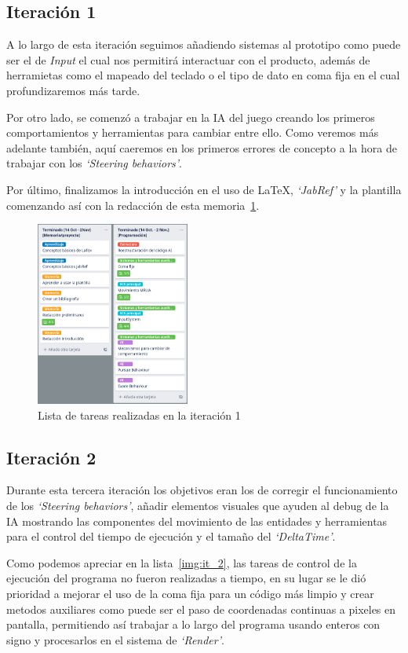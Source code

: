 \subsection{Iteración 1}
A lo largo de esta iteración seguimos añadiendo sistemas al prototipo como puede ser el
de \textit{Input} el cual nos permitirá interactuar con el producto, además de herramietas
como el mapeado del teclado o el tipo de dato en coma fija en el cual profundizaremos más tarde.

Por otro lado, se comenzó a trabajar en la \ac{IA} del juego creando los primeros comportamientos
y herramientas para cambiar entre ello. Como veremos más adelante también, aquí caeremos en los primeros
errores de concepto a la hora de trabajar con los \textit{`Steering behaviors'}.

Por último, finalizamos la introducción en el uso de \LaTeX, \textit{`JabRef'} y la plantilla comenzando 
así con la redacción de esta memoria~\ref{img:it_1}.

\begin{figure}[ht]
\centering
\includegraphics[width=0.45\textwidth]{imagenes/metodologia/tareas_it1.png}
\caption{Lista de tareas realizadas en la iteración 1}
\label{img:it_1}
\end{figure}

\subsection{Iteración 2}
Durante esta tercera iteración los objetivos eran los de corregir el funcionamiento de los
\textit{`Steering behaviors'}, añadir elementos visuales que ayuden al debug de la \ac{IA}
mostrando las componentes del movimiento de las entidades y herramientas para el control del
tiempo de ejecución y el tamaño del \textit{`DeltaTime'}.

Como podemos apreciar en la lista~\ref{img:it_2}, las tareas de control de la ejecución del
programa no fueron realizadas a tiempo, en su lugar se le dió prioridad a mejorar el uso
de la coma fija para un código más limpio y crear metodos auxiliares como puede ser el paso de
coordenadas continuas a pixeles en pantalla, permitiendo así trabajar a lo largo del programa 
usando enteros con signo y procesarlos en el sistema de \textit{`Render'}.


